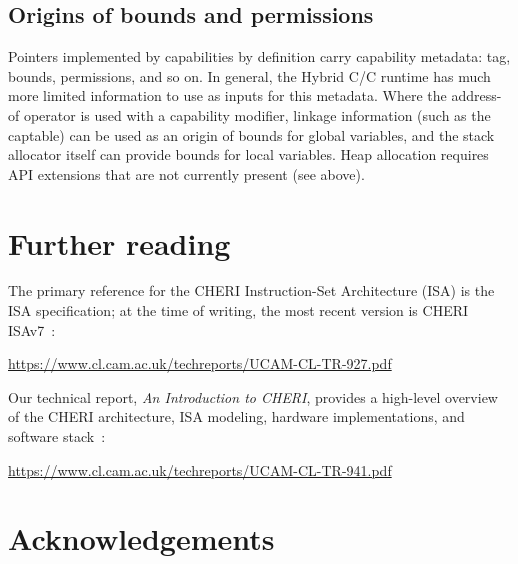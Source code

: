 \documentclass[12pt,twoside,openright,a4paper]{article}
\newcommand{\note}[2]{{\color{blue}[ Note: #1 - #2]}}
\renewcommand{\note}[2]{\relax\ifhmode\unskip\fi}
\newcommand{\rwnote}[1]{\note{#1}{Robert W.}}
\newcommand*{\cpp}{\texorpdfstring{C\textsmaller[2]{\protect\nolinebreak[4]\hspace{-.05em}\raisebox{.45ex}{\textbf{++}}}}{C++}}
\newcommand*{\COrCpp}{C/\cpp{}}
\newcommand*{\hybridCOrCpp}{Hybrid \COrCpp{}}
\begin{document}
\subsection{Origins of bounds and permissions}

Pointers implemented by capabilities by definition carry capability metadata:
tag, bounds, permissions, and so on.
In general, the \hybridCOrCpp{} runtime has much more limited information to
use as inputs for this metadata.
Where the address-of operator is used with a capability modifier, linkage
information (such as the captable) can be used as an origin of bounds for
global variables, and the stack allocator itself can provide bounds for local
variables.
Heap allocation requires API extensions that are not currently present (see
above).

\section{Further reading}
\label{sec:further_reading}

\rwnote{Update: The two real references are likely the CHERI C/C++ guide and
the Introduction to CHERI report}

The primary reference for the CHERI Instruction-Set Architecture (ISA) is the
ISA specification; at the time of writing, the most recent version is CHERI
ISAv7~\cite{UCAM-CL-TR-927}:

\smallskip
\noindent
\url{https://www.cl.cam.ac.uk/techreports/UCAM-CL-TR-927.pdf}
\smallskip

\noindent
Our technical report, \textit{An Introduction to CHERI}, provides a high-level
overview of the CHERI architecture, ISA modeling, hardware implementations,
and software stack~\cite{UCAM-CL-TR-941}:

\smallskip
\noindent
\url{https://www.cl.cam.ac.uk/techreports/UCAM-CL-TR-941.pdf}
\smallskip

\section{Acknowledgements}

\rwnote{Update feedback acknowledgments here.}

\rwnote{Add authors of CHERI C/C++ Programming Guide who don't end up being
  authors on this document.}
\end{document}

